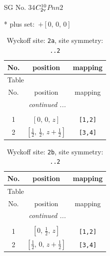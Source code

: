\documentclass[fleqn,8pt]{jsarticle}
\begin{document}
\setcounter{MaxMatrixCols}{32}

\renewcommand{\tablename}{Table~}
\renewcommand{\figurename}{Figure~}
\begin{center}
\LARGE
SG No. 34\quad$C_{\rm 2v}^{10}$\quad$Pnn2$\quad[ orthorhombic ]
\end{center}
* plus set:\,\,\,$+\left[ 0,\, 0,\, 0 \right]$
\renewcommand{\arraystretch}{1.2}
\begin{longtable}{ccc}
\caption{Wyckoff site: {\tt 2a}, site symmetry: {\tt ..2}}
 \\
 \hline \hline
No. & position & mapping \\ \hline \endfirsthead

\multicolumn{2}{l}{\tablename\ \thetable{}} \\
 \hline \hline
No. & position & mapping \\ \hline \endhead

 \hline \hline
\multicolumn{2}{r}{\footnotesize\it continued ...} \\ \endfoot

 \hline \hline
\multicolumn{2}{r}{} \\ \endlastfoot

1 & $\left[ 0,\, 0,\, z \right]$ & {\tt [1,2]} \\ \hline
2 & $\left[ \frac{1}{2},\, \frac{1}{2},\, z + \frac{1}{2} \right]$ & {\tt [3,4]} \\
\end{longtable}
\renewcommand{\arraystretch}{1.2}
\begin{longtable}{ccc}
\caption{Wyckoff site: {\tt 2b}, site symmetry: {\tt ..2}}
 \\
 \hline \hline
No. & position & mapping \\ \hline \endfirsthead

\multicolumn{2}{l}{\tablename\ \thetable{}} \\
 \hline \hline
No. & position & mapping \\ \hline \endhead

 \hline \hline
\multicolumn{2}{r}{\footnotesize\it continued ...} \\ \endfoot

 \hline \hline
\multicolumn{2}{r}{} \\ \endlastfoot

1 & $\left[ 0,\, \frac{1}{2},\, z \right]$ & {\tt [1,2]} \\ \hline
2 & $\left[ \frac{1}{2},\, 0,\, z + \frac{1}{2} \right]$ & {\tt [3,4]} \\
\end{longtable}
\end{document}
